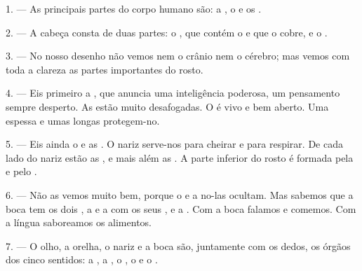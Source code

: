 %

\VUsaut{4.0mm}
\VUsaut{2.0mm}

\VUsaut{2.4mm}
\VUsaut{3.0mm}

1. --- As principais partes do corpo humano são: a , o
 e os .

\VUsaut{3.0mm}

2. --- A cabeça consta de duas partes: o , que contém o
 e que o  cobre, e o .

3. --- No nosso desenho não vemos nem o crânio nem o cérebro; mas vemos
com toda a clareza as partes importantes do rosto.

4. --- Eis primeiro a , que anuncia uma inteligência
poderosa, um pensamento sempre desperto. As  estão muito
desafogadas. O  é vivo e bem aberto. Uma 
espessa e umas  longas protegem-no.

5. --- Eis ainda o  e as . O nariz serve-nos
para cheirar e para respirar. De cada lado do nariz estão as
, e mais além as . A parte inferior do rosto é
formada pela  e pelo .

6. --- Não as vemos muito bem, porque o  e a 
no-las ocultam. Mas sabemos que a boca tem os dois , a
 e a  com os seus
, e a . Com a boca falamos e comemos. Com a
língua saboreamos os alimentos.

7. --- O olho, a orelha, o nariz e a boca são, juntamente com os dedos,
os órgãos dos cinco sentidos: a , a , o
, o  e o .

